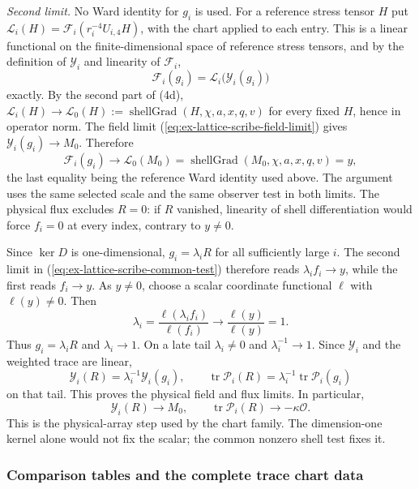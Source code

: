 \emph{Second limit.} No Ward identity for $g_i$ is used. For a reference
stress tensor $H$ put $\mathcal L_i(H)=\mathscr F_i(r_i^{-4}U_{i,4}H)$,
with the chart applied to each entry. This is a linear functional on the
finite-dimensional space of reference stress tensors, and by the
definition of $\mathcal Y_i$ and linearity of $\mathscr F_i$,
\[
 \mathscr F_i(g_i)=\mathcal L_i\bigl(\mathcal Y_i(g_i)\bigr)
\]
exactly. By the second part of (4d), $\mathcal L_i(H)\to\mathcal L_0(H)
:=\operatorname{shellGrad}(H,\chi,a,x,q,v)$ for every fixed $H$, hence
in operator norm. The field limit
(\ref{eq:ex-lattice-scribe-field-limit}) gives
$\mathcal Y_i(g_i)\to M_0$. Therefore
\[
 \mathscr F_i(g_i)\longrightarrow\mathcal L_0(M_0)
 =\operatorname{shellGrad}(M_0,\chi,a,x,q,v)=y,
\]
the last equality being the reference Ward identity used above.
The argument uses the same selected scale and the same observer test in both
limits. The physical flux excludes $R=0$: if $R$ vanished, linearity of
shell differentiation would force $f_i=0$ at every index, contrary to
$y\ne0$.

Since $\ker D$ is one-dimensional, $g_i=\lambda_iR$ for all sufficiently
large $i$. The second limit in (\ref{eq:ex-lattice-scribe-common-test})
therefore reads $\lambda_i f_i\to y$, while the first reads $f_i\to y$.
As $y\ne0$, choose a scalar coordinate functional $\ell$ with $\ell(y)\ne0$.
Then
\[
 \lambda_i=\frac{\ell(\lambda_i f_i)}{\ell(f_i)}\longrightarrow
 \frac{\ell(y)}{\ell(y)}=1.
\]
Thus $g_i=\lambda_iR$ and $\lambda_i\to1$. On a late tail
$\lambda_i\ne0$ and $\lambda_i^{-1}\to1$. Since $\mathcal Y_i$
and the weighted trace are linear,
\[
 \mathcal Y_i(R)=\lambda_i^{-1}\mathcal Y_i(g_i),
 \qquad
 \operatorname{tr}\mathcal P_i(R)=\lambda_i^{-1}
       \operatorname{tr}\mathcal P_i(g_i)
\]
on that tail. This proves the physical field and flux limits. In particular,
\begin{equation}
 \mathcal Y_i(R)\longrightarrow M_0,
 \qquad \operatorname{tr}\mathcal P_i(R)\longrightarrow-\kappa\mathcal O.
 \label{eq:ex-lattice-scribe-physical-transfer}
\end{equation}
This is the physical-array step used by the chart family. The dimension-one
kernel alone would not fix the scalar; the common nonzero shell test fixes it.

\subsubsection{Comparison tables and the complete trace chart data}

